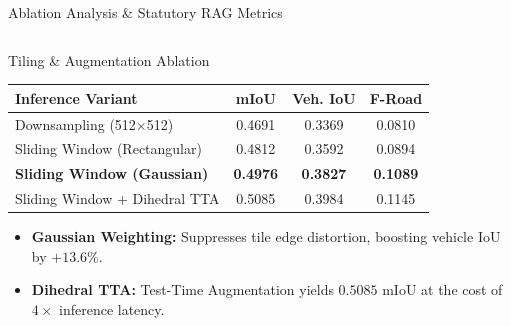 \documentclass[aspectratio=169, 10pt, professionalfonts]{beamer}
\begin{document}
\begin{frame}{Ablation Analysis \& Statutory RAG Metrics}
  \begin{columns}[T]
    \begin{column}{0.52\textwidth}
      \begin{block}{Tiling \& Augmentation Ablation}
        \tiny
        \begin{tabularx}{\textwidth}{l C C C}
          \toprule
          \textbf{Inference Variant} & \textbf{mIoU} & \textbf{Veh. IoU} & \textbf{F-Road} \\
          \midrule
          Downsampling (512$\times$512) & 0.4691 & 0.3369 & 0.0810 \\
          Sliding Window (Rectangular) & 0.4812 & 0.3592 & 0.0894 \\
          \textbf{Sliding Window (Gaussian)} & \textbf{0.4976} & \textbf{0.3827} & \textbf{0.1089} \\
          Sliding Window + Dihedral TTA & 0.5085 & 0.3984 & 0.1145 \\
          \bottomrule
        \end{tabularx}
        \vspace{0.4em}
        \begin{itemize}\tiny
          \item \textbf{Gaussian Weighting:} Suppresses tile edge distortion, boosting vehicle IoU by $+13.6\%$.
          \item \textbf{Dihedral TTA:} Test-Time Augmentation yields $0.5085$ mIoU at the cost of $4\times$ inference latency.
        \end{itemize}
      \end{block}
    \end{column}
    

\end{columns}
\end{frame}
\end{document}
